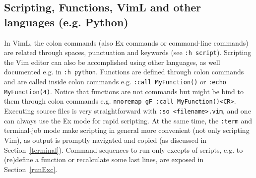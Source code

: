 \documentclass{article}
\newcommand{\tttt}[1]{\texttt{#1}}
\begin{document}
\subsection{Scripting, Functions, VimL and other languages (e.g.  Python)}\label{script}
In VimL,
the colon commands (also Ex commands or command-line commands) are related through spaces,
punctuation and keywords (see \texttt{:h script}).
Scripting the Vim editor can also be accomplished using other languages,
as well documented e.g. in \tttt{:h python}.
Functions are defined through colon commands and are called
inside colon commands e.g. \tttt{:call MyFunction()}
or \tttt{:echo MyFunction(4)}.
Notice that functions are not commands but might be bind to them
through colon commands e.g. \tttt{nnoremap gF :call MyFunction()<CR>}.
Executing source files is very straightforward with
\tttt{:so <filename>.vim},
and one can always use the Ex mode for rapid scripting.
At the same time, the \tttt{:term} and terminal-job mode make
scripting in general more convenient (not only scripting Vim), as output is
promptly navigated and copied (as discussed in Section~\ref{terminal}).
Command sequences to run only excepts of scripts, e.g.
to (re)define a function or recalculate some last lines,
are exposed in Section~\ref{runExc}.
\end{document}
